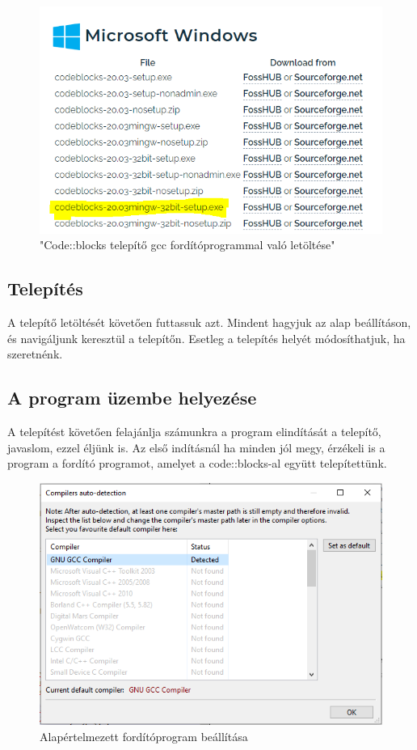 \begin{figure}[H]
	\centering
	\includegraphics[width=0.8\linewidth]{images/bevezetes/download_installer}
	\caption{"Code::blocks telepítő gcc fordítóprogrammal való letöltése"}
	\label{fig:choose}
\end{figure}

\subsection{Telepítés}

A telepítő letöltését követően futtassuk azt. Mindent hagyjuk az alap beállításon, és navigáljunk keresztül a telepítőn. Esetleg a telepítés helyét módosíthatjuk, ha szeretnénk.

\subsection{A program üzembe helyezése}

A telepítést követően felajánlja számunkra a program elindítását a telepítő, javaslom, ezzel éljünk is. Az első indításnál ha minden jól megy, érzékeli is a program a fordító programot, amelyet a code::blocks-al együtt telepítettünk.

\begin{figure}[H]
	\centering
	\includegraphics[width=1.0\linewidth]{images/bevezetes/set_compiler}
	\caption{Alapértelmezett fordítóprogram beállítása}
	\label{fig:choose}
\end{figure}

